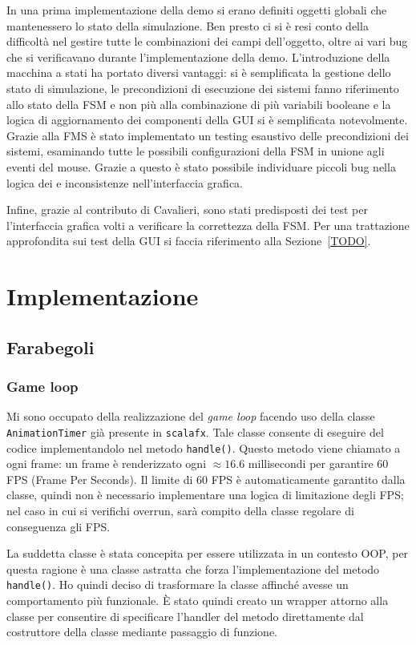 In una prima implementazione della demo si erano definiti oggetti globali che mantenessero lo stato della simulazione.
Ben presto ci si è resi conto della difficoltà nel gestire tutte le combinazioni dei campi dell'oggetto, oltre
ai vari bug che si verificavano durante l'implementazione della demo.
L'introduzione della macchina a stati ha portato diversi vantaggi: si è semplificata la gestione dello
stato di simulazione, le precondizioni di esecuzione dei sistemi fanno riferimento allo stato della FSM e non più alla
combinazione di più variabili booleane e la logica di aggiornamento dei componenti della GUI si è semplificata
notevolmente.
Grazie alla FMS è stato implementato un testing esaustivo delle precondizioni dei sistemi, esaminando tutte
le possibili configurazioni della FSM in unione agli eventi del mouse.
Grazie a questo è stato possibile individuare piccoli bug nella logica dei \System e inconsistenze nell'interfaccia
grafica.

Infine, grazie al contributo di Cavalieri, sono stati predisposti dei test per l'interfaccia grafica volti a verificare
la correttezza della FSM. Per una trattazione approfondita sui test della GUI si faccia riferimento alla
Sezione~\ref{TODO}.

\section{Implementazione}\label{sec:demo-implementazione}

\subsection{Farabegoli}\label{subsec:farabegoli2}
\subsubsection{Game loop}
Mi sono occupato della realizzazione del \textit{game loop} facendo uso della classe \texttt{AnimationTimer} già
presente in \texttt{scalafx}.
Tale classe consente di eseguire del codice implementandolo nel metodo \texttt{handle()}.
Questo metodo viene chiamato a ogni frame: un frame è renderizzato ogni $\approx16.6$ millisecondi per garantire 60 FPS
(Frame Per Seconds).
Il limite di 60 FPS è automaticamente garantito dalla classe, quindi non è necessario implementare una logica di
limitazione degli FPS\@; nel caso in cui si verifichi overrun, sarà compito della classe regolare di conseguenza gli
FPS\@.

La suddetta classe è stata concepita per essere utilizzata in un contesto OOP, per questa ragione è una classe astratta
che forza l'implementazione del metodo \texttt{handle()}.
Ho quindi deciso di trasformare la classe affinché avesse un comportamento più funzionale.
È stato quindi creato un wrapper attorno alla classe per consentire di specificare l'handler del metodo direttamente
dal costruttore della classe mediante passaggio di funzione.

